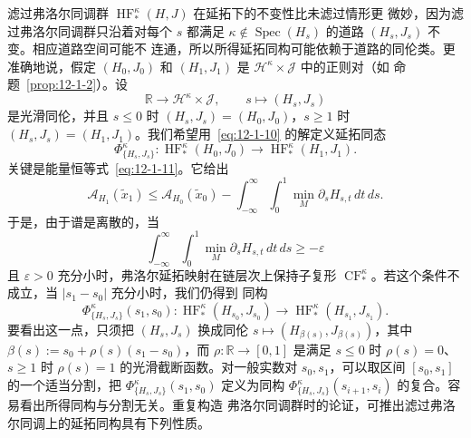 滤过弗洛尔同调群 $\operatorname{HF}_*^\kappa(H,J)$ 在延拓下的不变性比未滤过情形更
微妙，因为滤过弗洛尔同调群只沿着对每个 $s$ 都满足
$\kappa\notin\operatorname{Spec}(H_s)$ 的道路 $(H_s,J_s)$ 不变。相应道路空间可能不
连通，所以所得延拓同构可能依赖于道路的同伦类。更准确地说，假定
$(H_0,J_0)$ 和 $(H_1,J_1)$ 是 $\mathcal H^\kappa\times\mathcal J$ 中的正则对（如
命题~\ref{prop:12-1-2}）。设
\[
  \mathbb R\longrightarrow\mathcal H^\kappa\times\mathcal J,
  \qquad s\longmapsto(H_s,J_s)
\]
是光滑同伦，并且 $s\le0$ 时 $(H_s,J_s)=(H_0,J_0)$，$s\ge1$ 时
$(H_s,J_s)=(H_1,J_1)$。我们希望用~\eqref{eq:12-1-10} 的解定义延拓同态
\[
  \Phi^\kappa_{\{H_s,J_s\}}:
  \operatorname{HF}_*^\kappa(H_0,J_0)
  \longrightarrow\operatorname{HF}_*^\kappa(H_1,J_1).
\]
关键是能量恒等式~\eqref{eq:12-1-11}。它给出
\[
  \mathcal A_{H_1}(\widetilde x_1)
  \le\mathcal A_{H_0}(\widetilde x_0)
  -\int_{-\infty}^{\infty}\int_0^1
  \min_M\partial_sH_{s,t}\,dt\,ds.
\]
于是，由于谱是离散的，当
\[
  \int_{-\infty}^{\infty}\int_0^1
  \min_M\partial_sH_{s,t}\,dt\,ds\ge-\varepsilon
\]
且 $\varepsilon>0$ 充分小时，弗洛尔延拓映射在链层次上保持子复形
$\operatorname{CF}_*^\kappa$。若这个条件不成立，当 $|s_1-s_0|$ 充分小时，我们仍得到
同构
\[
  \Phi^\kappa_{\{H_s,J_s\}}(s_1,s_0):
  \operatorname{HF}_*^\kappa(H_{s_0},J_{s_0})
  \longrightarrow\operatorname{HF}_*^\kappa(H_{s_1},J_{s_1}).
\]
要看出这一点，只须把 $(H_s,J_s)$ 换成同伦
$s\mapsto(H_{\beta(s)},J_{\beta(s)})$，其中
$\beta(s):=s_0+\rho(s)(s_1-s_0)$，而
$\rho:\mathbb R\to[0,1]$ 是满足 $s\le0$ 时 $\rho(s)=0$、$s\ge1$ 时
$\rho(s)=1$ 的光滑截断函数。对一般实数对 $s_0,s_1$，可以取区间
$[s_0,s_1]$ 的一个适当分割，把 $\Phi^\kappa_{\{H_s,J_s\}}(s_1,s_0)$ 定义为同构
$\Phi^\kappa_{\{H_s,J_s\}}(s_{i+1},s_i)$ 的复合。容易看出所得同构与分割无关。重复构造
弗洛尔同调群时的论证，可推出滤过弗洛尔同调上的延拓同构具有下列性质。

